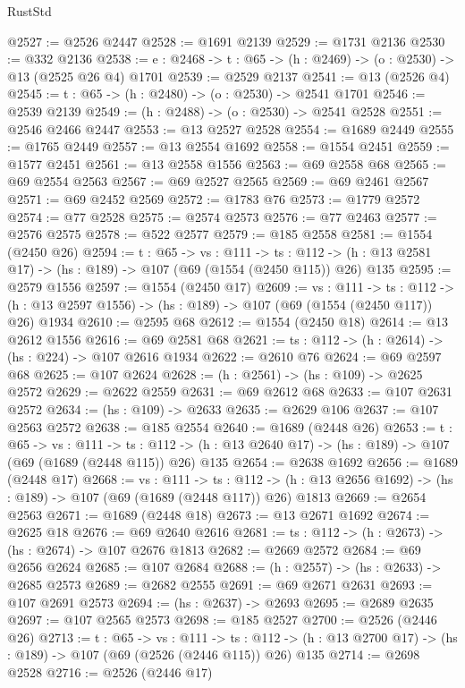 \begin{lexlean}{RustStd}
\begin{coremodule}
{\begin{coremodule}
{{{{{{{{{@2527 := @2526 @2447
@2528 := @1691 @2139
@2529 := @1731 @2136
@2530 := @332 @2136
@2538 := {e : @2468} -> {t : @65} -> (h : @2469) -> (o : @2530) -> @13 (@2525 @26 @4) @1701
@2539 := @2529 @2137
@2541 := @13 (@2526 @4)
@2545 := {t : @65} -> (h : @2480) -> (o : @2530) -> @2541 @1701
@2546 := @2539 @2139
@2549 := (h : @2488) -> (o : @2530) -> @2541 @2528
@2551 := @2546 @2466 @2447
@2553 := @13 @2527 @2528
@2554 := @1689 @2449
@2555 := @1765 @2449
@2557 := @13 @2554 @1692
@2558 := @1554 @2451
@2559 := @1577 @2451
@2561 := @13 @2558 @1556
@2563 := @69 @2558 @68
@2565 := @69 @2554 @2563
@2567 := @69 @2527 @2565
@2569 := @69 @2461 @2567
@2571 := @69 @2452 @2569
@2572 := @1783 @76
@2573 := @1779 @2572
@2574 := @77 @2528
@2575 := @2574 @2573
@2576 := @77 @2463
@2577 := @2576 @2575
@2578 := @522 @2577
@2579 := @185 @2558
@2581 := @1554 (@2450 @26)
@2594 := {t : @65} ->
  {vs : @111} ->
  {ts : @112} -> (h : @13 @2581 @17) -> (hs : @189) -> @107 (@69 (@1554 (@2450 @115)) @26) @135
@2595 := @2579 @1556
@2597 := @1554 (@2450 @17)
@2609 := {vs : @111} ->
  {ts : @112} -> (h : @13 @2597 @1556) -> (hs : @189) -> @107 (@69 (@1554 (@2450 @117)) @26) @1934
@2610 := @2595 @68
@2612 := @1554 (@2450 @18)
@2614 := @13 @2612 @1556
@2616 := @69 @2581 @68
@2621 := {ts : @112} -> (h : @2614) -> (hs : @224) -> @107 @2616 @1934
@2622 := @2610 @76
@2624 := @69 @2597 @68
@2625 := @107 @2624
@2628 := (h : @2561) -> (hs : @109) -> @2625 @2572
@2629 := @2622 @2559
@2631 := @69 @2612 @68
@2633 := @107 @2631 @2572
@2634 := (hs : @109) -> @2633
@2635 := @2629 @106
@2637 := @107 @2563 @2572
@2638 := @185 @2554
@2640 := @1689 (@2448 @26)
@2653 := {t : @65} ->
  {vs : @111} ->
  {ts : @112} -> (h : @13 @2640 @17) -> (hs : @189) -> @107 (@69 (@1689 (@2448 @115)) @26) @135
@2654 := @2638 @1692
@2656 := @1689 (@2448 @17)
@2668 := {vs : @111} ->
  {ts : @112} -> (h : @13 @2656 @1692) -> (hs : @189) -> @107 (@69 (@1689 (@2448 @117)) @26) @1813
@2669 := @2654 @2563
@2671 := @1689 (@2448 @18)
@2673 := @13 @2671 @1692
@2674 := @2625 @18
@2676 := @69 @2640 @2616
@2681 := {ts : @112} -> (h : @2673) -> (hs : @2674) -> @107 @2676 @1813
@2682 := @2669 @2572
@2684 := @69 @2656 @2624
@2685 := @107 @2684
@2688 := (h : @2557) -> (hs : @2633) -> @2685 @2573
@2689 := @2682 @2555
@2691 := @69 @2671 @2631
@2693 := @107 @2691 @2573
@2694 := (hs : @2637) -> @2693
@2695 := @2689 @2635
@2697 := @107 @2565 @2573
@2698 := @185 @2527
@2700 := @2526 (@2446 @26)
@2713 := {t : @65} ->
  {vs : @111} ->
  {ts : @112} -> (h : @13 @2700 @17) -> (hs : @189) -> @107 (@69 (@2526 (@2446 @115)) @26) @135
@2714 := @2698 @2528
@2716 := @2526 (@2446 @17)
}}}}}}}}}
\end{coremodule}}
\end{coremodule}
\end{lexlean}
